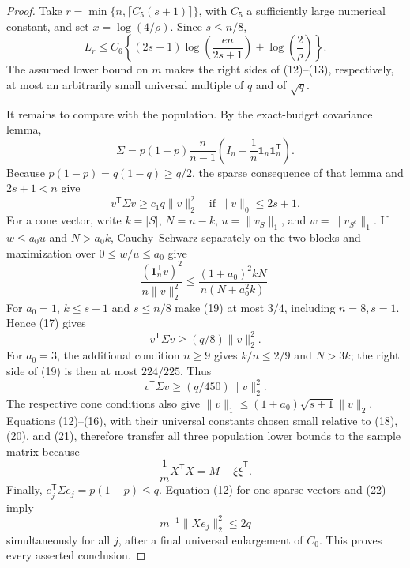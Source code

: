 \documentclass{article}
\begin{document}
\begin{proof}
Take \(r=\min\{n,\lceil C_5(s+1)\rceil\}\), with \(C_5\) a sufficiently large numerical constant, and set \(x=\log(4/\rho)\).  Since \(s\le n/8\),
\[
 L_r\le C_6\left\{(2s+1)\log\!\left(\frac{en}{2s+1}\right)
                       +\log\!\left(\frac2\rho\right)\right\}.
 \tag{16}
\]
The assumed lower bound on \(m\) makes the right sides of (12)--(13), respectively, at most an arbitrarily small universal multiple of \(q\) and of \(\sqrt q\).

It remains to compare with the population.  By the exact-budget covariance lemma,
\[
 \Sigma=p(1-p)\frac{n}{n-1}
 \left(I_n-\frac1n\mathbf 1_n\mathbf 1_n^{\mathsf T}\right).
 \tag{17}
\]
Because \(p(1-p)=q(1-q)\ge q/2\), the sparse consequence of that lemma and \(2s+1<n\) give
\[
 v^{\mathsf T}\Sigma v\ge c_1q\lVert v\rVert_2^2
 \quad\text{if }\lVert v\rVert_0\le2s+1.
 \tag{18}
\]
For a cone vector, write \(k=|S|\), \(N=n-k\), \(u=\lVert v_S\rVert_1\), and \(w=\lVert v_{S^c}\rVert_1\).  If \(w\le a_0u\) and \(N>a_0k\), Cauchy--Schwarz separately on the two blocks and maximization over \(0\le w/u\le a_0\) give
\[
 \frac{(\mathbf 1_n^{\mathsf T}v)^2}{n\lVert v\rVert_2^2}
 \le \frac{(1+a_0)^2kN}{n(N+a_0^2k)}.
 \tag{19}
\]
For \(a_0=1\), \(k\le s+1\) and \(s\le n/8\) make (19) at most \(3/4\), including \(n=8,s=1\).  Hence (17) gives
\[
 v^{\mathsf T}\Sigma v\ge(q/8)\lVert v\rVert_2^2.
 \tag{20}
\]
For \(a_0=3\), the additional condition \(n\ge9\) gives \(k/n\le2/9\) and \(N>3k\); the right side of (19) is then at most \(224/225\).  Thus
\[
 v^{\mathsf T}\Sigma v\ge(q/450)\lVert v\rVert_2^2.
 \tag{21}
\]
The respective cone conditions also give \(\lVert v\rVert_1\le(1+a_0)\sqrt{s+1}\lVert v\rVert_2\).  Equations (12)--(16), with their universal constants chosen small relative to (18), (20), and (21), therefore transfer all three population lower bounds to the sample matrix because
\[
 \frac1mX^{\mathsf T}X=M-\bar\xi\bar\xi^{\mathsf T}.
 \tag{22}
\]
Finally, \(e_j^{\mathsf T}\Sigma e_j=p(1-p)\le q\).  Equation (12) for one-sparse vectors and (22) imply
\[
 m^{-1}\lVert Xe_j\rVert_2^2\le2q
\]
simultaneously for all \(j\), after a final universal enlargement of \(C_0\).  This proves every asserted conclusion.
\end{proof}
\end{document}
